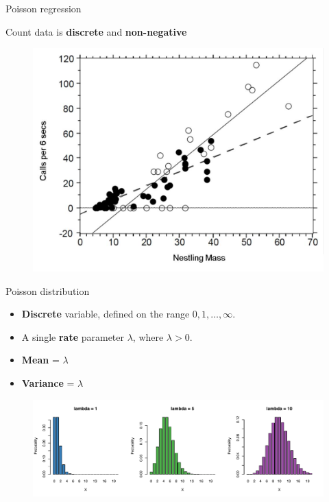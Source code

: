\documentclass[pdf]{beamer}
\begin{document}
\begin{frame}{Poisson regression}

Count data is \textbf{discrete} and \textbf{non-negative}

\begin{figure}
\includegraphics[width=.5\textwidth]{cuckooanalysis.png}
\end{figure}

\vspace{-.5cm}


\end{frame}

\begin{frame}{Poisson distribution}

\begin{itemize}\addtolength{\itemsep}{.5\baselineskip}
    \item \textbf{Discrete} variable, defined on the range $0, 1, \dots, \infty$.
    \item  A single \textbf{rate} parameter $\lambda$, where $\lambda > 0$.
    \item \textbf{Mean} = $\lambda$  
    \item \textbf{Variance} = $\lambda$
\end{itemize}

\begin{figure}
\includegraphics[width=.75\textwidth]{poissondist.pdf}
\end{figure}

\end{frame}
\end{document}
